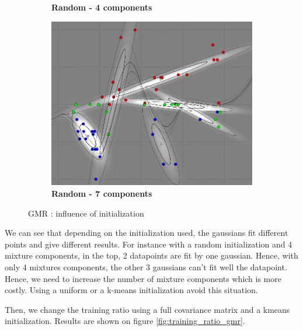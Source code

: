 \begin{figure}[!ht]
\begin{subfigure}[h]{0.3\textwidth}
\caption{\bf Random - 4 components}
\end{subfigure}
\begin{subfigure}[h]{0.3\textwidth}
\centering
\includegraphics[height=0.08\textheight]{./regression/full_cov_random_7_mixture_100train.png}
\caption{\bf Random - 7 components}
\end{subfigure}
\caption{GMR : influence of initialization}
\label{fig:initialization_gmr}
\end{figure}

We can see that depending on the initialization used, the gaussians fit different points and give different results. For instance with a random initialization and 4 mixture components, in the top, 2 datapoints are fit by one gaussian. Hence, with only 4 mixtures components, the other 3 gaussians can't fit well the datapoint. Hence, we need to increase the number of mixture components which is more costly. Using a uniform or a k-means initialization avoid this situation. 

Then, we change the training ratio using a full covariance matrix and a kmeans initialization. Results are shown on figure \ref{fig:training_ratio_gmr}.


